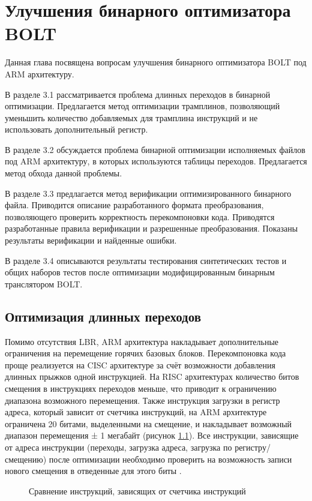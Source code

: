 \chapter{Улучшения бинарного оптимизатора BOLT}\label{ch:ch3}
Данная глава посвящена вопросам улучшения бинарного оптимизатора BOLT под ARM архитектуру.

В разделе 3.1 рассматривается проблема длинных переходов в бинарной оптимизации. Предлагается метод оптимизации трамплинов, позволяющий уменьшить количество добавляемых для трамплина инструкций и не использовать дополнительный регистр.

В разделе 3.2 обсуждается проблема бинарной оптимизации исполняемых файлов под ARM архитектуру, в которых используются таблицы переходов. Предлагается метод обхода данной проблемы.

В разделе 3.3 предлагается метод верификации оптимизированного бинарного файла. Приводится описание разработанного формата преобразования, позволяющего проверить корректность перекомпоновки кода. Приводятся разработанные правила верификации и разрешенные преобразования. Показаны результаты верификации и найденные ошибки.

В разделе 3.4 описываются результаты тестирования синтетических тестов и общих наборов тестов после оптимизации модифицированным бинарным транслятором BOLT.

\section{Оптимизация длинных переходов}\label{sec:ch3/sect1}
Помимо отсутствия LBR, ARM архитектура накладывает дополнительные ограничения на перемещение горячих базовых блоков. Перекомпоновка кода проще реализуется на CISC архитектуре за счёт возможности добавления длинных прыжков одной инструкцией. На RISC архитектурах количество битов смещения в инструкциях переходов меньше, что приводит к ограничению диапазона возможного перемещения. Также инструкция загрузки в регистр адреса, который зависит от счетчика инструкций, на ARM архитектуре ограничена 20 битами, выделенными на смещение, и накладывает возможный диапазон перемещения ± 1 мегабайт (рисунок \cref{fig:CmpPcRel}). Все инструкции, зависящие от адреса инструкции (переходы, загрузка адреса, загрузка по регистру/смещению) после оптимизации необходимо проверить на возможность записи нового смещения в отведенные для этого биты \cite{Blem2013} \cite{confbib1}.

\begin{figure}[ht]
    \caption{Сравнение инструкций, зависящих от счетчика инструкций}\label{fig:CmpPcRel}
\end{figure}

